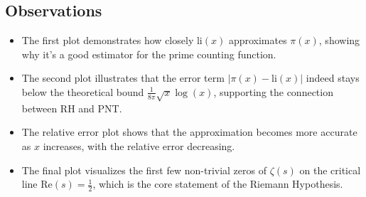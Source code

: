 \documentclass{article}
\begin{document}
\subsection*{Observations}

\begin{itemize}
\item The first plot demonstrates how closely $\text{li}(x)$ approximates $\pi(x)$, showing why it's a good estimator for the prime counting function.

\item The second plot illustrates that the error term $|\pi(x) - \text{li}(x)|$ indeed stays below the theoretical bound $\frac{1}{8\pi}\sqrt{x}\log(x)$, supporting the connection between RH and PNT.

\item The relative error plot shows that the approximation becomes more accurate as $x$ increases, with the relative error decreasing.

\item The final plot visualizes the first few non-trivial zeros of $\zeta(s)$ on the critical line $\text{Re}(s) = \frac{1}{2}$, which is the core statement of the Riemann Hypothesis.
\end{itemize}
\end{document}

